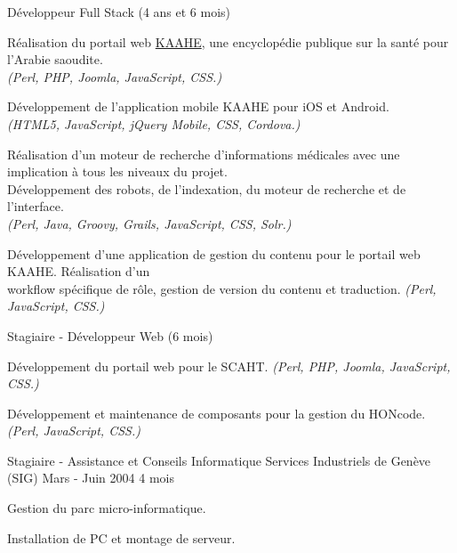 \begin{cventries}
  \cventry
    {Développeur Full Stack (4 ans et 6 mois)}
    {}
    {}
    {}
    {
      \begin{cvitems}
        \item Réalisation du portail web
          {\color{awesome-skyblue}\href{https://kaahe.org/}{KAAHE}}, une
          encyclopédie publique sur la santé pour l'Arabie saoudite.\\
          \textit{(Perl, PHP, Joomla, JavaScript, CSS.)}
        \item Développement de l'application mobile KAAHE pour iOS et Android.\\
          \textit{(HTML5, JavaScript, jQuery Mobile, CSS, Cordova.)}
        \item Réalisation d'un moteur de recherche d'informations médicales
          avec une implication à tous les niveaux du projet.\\
          Développement des robots, de l'indexation, du moteur de recherche
          et de l'interface.\\
          \textit{(Perl, Java, Groovy, Grails, JavaScript, CSS, Solr.)}
        \item Développement d'une application de gestion du contenu pour le
          portail web KAAHE. Réalisation d'un \\workflow spécifique de rôle,
          gestion de version du contenu et traduction.
          \textit{(Perl, JavaScript, CSS.)}
      \end{cvitems}
    }

  \cventry
    {Stagiaire - Développeur Web (6 mois)}
    {}
    {}
    {}
    {
      \begin{cvitems}
        \item Développement du portail web pour le SCAHT.
          \textit{(Perl, PHP, Joomla, JavaScript, CSS.)}
        \item Développement et maintenance de composants pour la gestion du
          HONcode. \textit{(Perl, JavaScript, CSS.)}
      \end{cvitems}
    }

  \cventry
    {Stagiaire - Assistance et Conseils Informatique}
    {Services Industriels de Genève (SIG)}
    {Mars - Juin 2004}
    {4 mois}
    {
      \begin{cvitems}
        \item Gestion du parc micro-informatique.
        \item Installation de PC et montage de serveur.
      \end{cvitems}
    }

\end{cventries}
